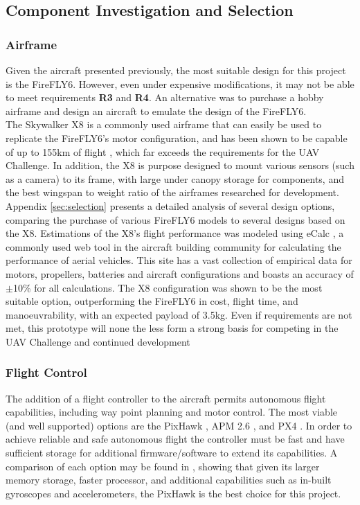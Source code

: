 \subsection{Component Investigation and Selection}
\subsubsection*{Airframe}
Given the aircraft presented previously, the most suitable design for this project is the FireFLY6. However, even under expensive modifications, it may not be able to meet requirements \textbf{R3} and \textbf{R4}. An alternative was to purchase a hobby airframe and design an aircraft to emulate the design of the FireFLY6.\\

The Skywalker X8 \cite{ref:x8} is a commonly used airframe that can easily be used to replicate the FireFLY6's motor configuration, and has been shown to be capable of up to 155km of flight \cite{ref:range}, which far exceeds the requirements for the UAV Challenge. In addition, the X8 is purpose designed to mount various sensors (such as a camera) to its frame, with large under canopy storage for components, and the best wingspan to weight ratio of the airframes researched for development.\\

Appendix \ref{sec:selection} presents a detailed analysis of several design options, comparing the purchase of various FireFLY6 models to several designs based on the X8. Estimations of the X8's flight performance was modeled using eCalc \cite{ref:ecalc}, a commonly used web tool in the aircraft building community for calculating the performance of aerial vehicles. This site has a vast collection of empirical data for motors, propellers, batteries and aircraft configurations and boasts an accuracy of $\pm$10\% for all calculations. The X8 configuration was shown to be the most suitable option, outperforming the FireFLY6 in cost, flight time, and manoeuvrability, with an expected payload of 3.5kg. Even if requirements are not met, this prototype will none the less form a strong basis for competing in the UAV Challenge and continued development \\


\subsubsection*{Flight Control}
The addition of a flight controller to the aircraft permits autonomous flight capabilities, including way point planning and motor control. The most viable (and well supported) options are the PixHawk \cite{ref:pixhawk}, APM 2.6 \cite{ref:ardupilot}, and PX4 \cite{ref:px4}. In order to achieve reliable and safe autonomous flight the controller must be fast and have sufficient storage for additional firmware/software to extend its capabilities. A comparison of each option may be found in \cite{ref:controller_comparison}, showing that given its larger memory storage, faster processor, and additional capabilities such as in-built gyroscopes and accelerometers, the PixHawk is the best choice for this project.

